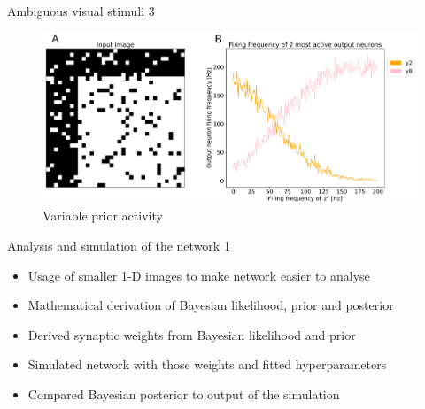 \documentclass[aspectratio=169]{beamer}
\begin{document}

\begin{frame}{Ambiguous visual stimuli 3}
		\begin{figure}
        \includegraphics[width=0.7\linewidth]{../Latex/figures/horvertAdaptiveInh/YFrequency_prior.png}
      \\   \scriptsize Variable prior activity
      \end{figure} 
\end{frame}

\begin{frame}{Analysis and
 simulation of the network 1}
	\begin{itemize}
	  \item Usage of smaller 1-D images to make network easier to analyse 
	  \item Mathematical derivation of Bayesian likelihood, prior and posterior
	  \item Derived synaptic weights from Bayesian likelihood and prior
	  \item Simulated network with those weights and fitted hyperparameters
	  \item Compared Bayesian posterior to output of the simulation
	\end{itemize}
\end{frame}
\end{document}
